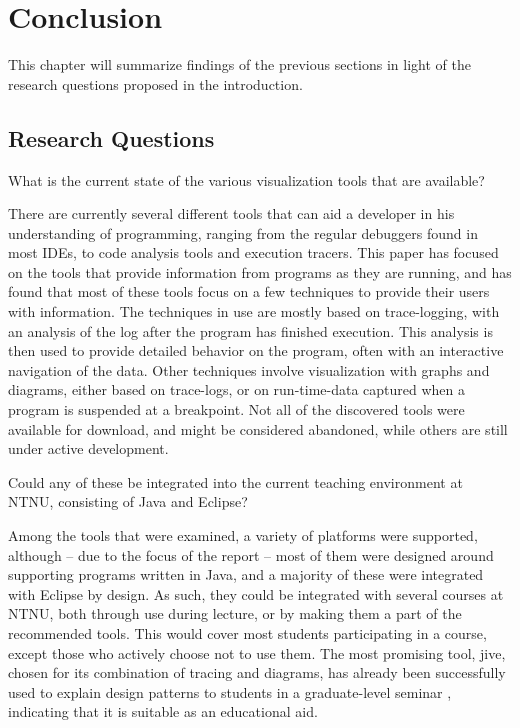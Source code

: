 \chapter{Conclusion}\label{conclusion}

This chapter will summarize findings of the previous sections in light of the research questions proposed in the introduction.

\section{Research Questions}\label{conclusionRQs}


\begin{theorem}
What is the current state of the various visualization tools that are available?
\end{theorem}

There are currently several different tools that can aid a developer in his understanding of programming, ranging from the regular debuggers found in most IDEs, to code analysis tools and execution tracers.
This paper has focused on the tools that provide information from programs as they are running, and has found that most of these tools focus on a few techniques to provide their users with information.
The techniques in use are mostly based on trace-logging, with an analysis of the log after the program has finished execution.
This analysis is then used to provide detailed behavior on the program, often with an interactive navigation of the data.
Other techniques involve visualization with graphs and diagrams, either based on trace-logs, or on run-time-data captured when a program is suspended at a breakpoint.
Not all of the discovered tools were available for download, and might be considered abandoned, while others are still under active development.


\begin{theorem}
Could any of these be integrated into the current teaching environment at NTNU, consisting of Java and Eclipse?
\end{theorem}

Among the tools that were examined, a variety of platforms were supported, although -- due to the focus of the report -- most of them were designed around supporting programs written in Java, and a majority of these were integrated with Eclipse by design.
As such, they could be integrated with several courses at NTNU, both through use during lecture, or by making them a part of the recommended tools.
This would cover most students participating in a course, except those who actively choose not to use them.
The most promising tool, \gls{jive}, chosen for its combination of tracing and diagrams, has already been successfully used to explain design patterns to students in a graduate-level seminar \cite[p. 99]{Gestwicki2005}, indicating that it is suitable as an educational aid.



